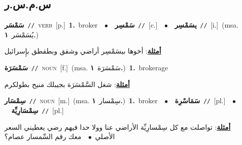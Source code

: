 \documentclass[10pt,a4paper,twoside]{article} %
\begin{document}
\begin{multicols}{2}
\vspace{-3mm}
\subsection*{\color{blue}\foreignlanguage{arabic}{س.م.س.ر}\color{blue}{}} 

{\setlength\topsep{0pt}\textbf{\foreignlanguage{arabic}{سَمْسَر}}\ {\color{gray}\texttt{//}\color{black}}\ \textsc{verb}\ [p.]\ \textbf{1.}~broker\ \ $\bullet$\ \ \setlength\topsep{0pt}\textbf{\foreignlanguage{arabic}{سَمْسِر}}\ {\color{gray}\texttt{//}\color{black}}\ [c.]\ \ $\bullet$\ \ \setlength\topsep{0pt}\textbf{\foreignlanguage{arabic}{يسَمْسِر}}\ {\color{gray}\texttt{//}\color{black}}\ [i.]\ \color{gray}(msa. \foreignlanguage{arabic}{يُسَمْسَر}~\foreignlanguage{arabic}{\textbf{١.}})\color{black}\  \begin{flushright}\color{gray}\foreignlanguage{arabic}{\textbf{\underline{\foreignlanguage{arabic}{أمثلة}}}: أخوها بيسَمْسِر أراضي وشقق وبطقطق بإِسرائيل}\end{flushright}\color{black}} \vspace{2mm}

{\setlength\topsep{0pt}\textbf{\foreignlanguage{arabic}{سَمْسَرَة}}\ {\color{gray}\texttt{//}\color{black}}\ \textsc{noun}\ [f.]\ \color{gray}(msa. \foreignlanguage{arabic}{سَمْسَرَة}~\foreignlanguage{arabic}{\textbf{١.}})\color{black}\ \textbf{1.}~brokerage\  \begin{flushright}\color{gray}\foreignlanguage{arabic}{\textbf{\underline{\foreignlanguage{arabic}{أمثلة}}}: شغل السَّمْسَرَة بجيبلك منيح بطولكرم}\end{flushright}\color{black}} \vspace{2mm}

{\setlength\topsep{0pt}\textbf{\foreignlanguage{arabic}{سِمْسَار}}\ {\color{gray}\texttt{//}\color{black}}\ \textsc{noun}\ [m.]\ \color{gray}(msa. \foreignlanguage{arabic}{سِمْسار}~\foreignlanguage{arabic}{\textbf{١.}})\color{black}\ \textbf{1.}~broker\ \ $\bullet$\ \ \setlength\topsep{0pt}\textbf{\foreignlanguage{arabic}{سَمَاسْرِة}}\ {\color{gray}\texttt{//}\color{black}}\ [pl.]\ \ $\bullet$\ \ \setlength\topsep{0pt}\textbf{\foreignlanguage{arabic}{سِمْسَارِيِّة}}\ {\color{gray}\texttt{//}\color{black}}\ [pl.]\  \begin{flushright}\color{gray}\foreignlanguage{arabic}{\textbf{\underline{\foreignlanguage{arabic}{أمثلة}}}: تواصلت مع كل سِمْسارِيِّة الأراضي عنا وولا حدا فيهم رضي يعطيني السعر الأصلي\ $\bullet$\ \  معك رقم السِّمسار عصام؟}\end{flushright}\color{black}} \vspace{2mm}


\end{multicols}
\end{document}
